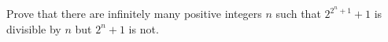 Prove that there are infinitely many positive integers $n$ such that $2^{2^n+1}+1$ is divisible by $n$ but $2^n+1$ is not.